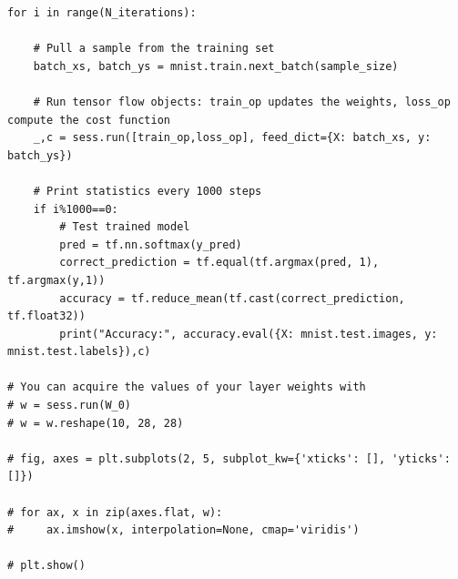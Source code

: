 \documentclass[12pt]{article}
\begin{document}
\begin{flushleft}
\begin{lstlisting}
for i in range(N_iterations):
	
	# Pull a sample from the training set
	batch_xs, batch_ys = mnist.train.next_batch(sample_size)
	
	# Run tensor flow objects: train_op updates the weights, loss_op compute the cost function
	_,c = sess.run([train_op,loss_op], feed_dict={X: batch_xs, y: batch_ys})
	
	# Print statistics every 1000 steps
	if i%1000==0:
		# Test trained model
		pred = tf.nn.softmax(y_pred)
		correct_prediction = tf.equal(tf.argmax(pred, 1), tf.argmax(y,1))
		accuracy = tf.reduce_mean(tf.cast(correct_prediction, tf.float32))
		print("Accuracy:", accuracy.eval({X: mnist.test.images, y: mnist.test.labels}),c)

# You can acquire the values of your layer weights with
# w = sess.run(W_0)
# w = w.reshape(10, 28, 28)

# fig, axes = plt.subplots(2, 5, subplot_kw={'xticks': [], 'yticks': []})

# for ax, x in zip(axes.flat, w):
#     ax.imshow(x, interpolation=None, cmap='viridis')

# plt.show()

		\end{lstlisting}
		
	\end{flushleft}
\end{document}
